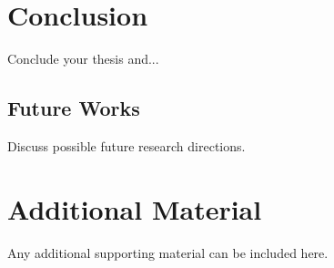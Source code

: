 \documentclass[12pt,a4paper]{report}
\begin{document}
\chapter{Conclusion}
\label{ch:conclusion}
Conclude your thesis and...

\section{Future Works}
\label{sec:future_works}

Discuss possible future research directions.


\appendix
\chapter{Additional Material}
Any additional supporting material can be included here.



\end{document}
